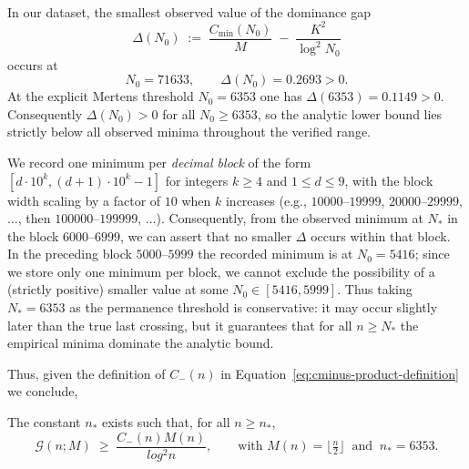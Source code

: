 \documentclass[11pt]{article}
\makeatletter
\theoremstyle{inline}
\theoremstyle{break}
\renewenvironment{proof}[1][\proofname]{%
  \par\pushQED{\qed}%
  \normalfont \topsep6\p@\@plus6\p@\relax
  \trivlist
  \item[\hskip\labelsep
        \itshape
    #1\@addpunct{.}]\mbox{}\\  %
}{%
  \popQED\endtrivlist\@endpefalse
}
\theoremstyle{break}
\theoremstyle{break}
\theoremstyle{break}
\theoremstyle{break}
\theoremstyle{inline}
\newcommand{\xPreMertens}{5416} %
\newcommand{\xMertens}{6353} %
\newcommand{\xNzeroStat}{71633} %
\newcommand{\xEtaStat}{0.2693} %
\newcommand{\xDeltaMertens}{0.1149}  %
\newcommand{\Cmeas}{C}              %
\newcommand{\CminusProduct}{C_{-}}
\makeatother
\begin{document}
\begin{proof}
In our dataset, the smallest observed value of the dominance gap
\begin{equation}
\Delta(N_0)\;:=\;\frac{\Cmeas_{\min}(N_0)}{M}\;-\;\frac{K^2}{\log^2 N_0}
\end{equation}
occurs at
\begin{equation}
N_0=\xNzeroStat,\qquad \Delta(N_0)=\xEtaStat>0.
\end{equation}
At the explicit Mertens threshold \(N_0=\xMertens\) one has
\(\Delta(\xMertens)=\xDeltaMertens>0\).
Consequently \(\Delta(N_0)>0\) for all \(N_0\ge \xMertens\), so the analytic
lower bound lies strictly below all observed minima throughout the verified range.

We record one minimum per \emph{decimal block} of the form
\([d\cdot 10^{k},(d+1)\cdot 10^{k}-1]\) for integers \(k\ge 4\) and \(1\le d\le 9\),
with the block width scaling by a factor of \(10\) when \(k\) increases (e.g.,
\(10000\text{–}19999\), \(20000\text{–}29999\), \(\dots\), then \(100000\text{–}199999\), \(\dots\)).
Consequently, from the observed minimum at \(N_\ast\) in the block
\(6000\text{–}6999\), we can assert that no smaller \( \Delta \) occurs within that block.
In the preceding block \(5000\text{–}5999\) the recorded minimum is at \(N_0=\xPreMertens\);
since we store only one minimum per block, we cannot exclude the possibility of a
(strictly positive) smaller value at some \(N_0\in[\xPreMertens,5999]\). Thus taking
\(N_\ast=\xMertens\) as the permanence threshold is conservative: it may occur
slightly later than the true last crossing, but it guarantees that for all
\(n\ge N_\ast\) the empirical minima dominate the analytic bound.

\bigskip
\noindent
Thus, given the definition of \( \CminusProduct(n) \) in Equation~\ref{eq:cminus-product-definition} we conclude,

The constant \( n_\ast \) exists such that, for all \(n \ge n_\ast\),
  \begin{equation}
    \mathcal{G}(n;M)\;\ge\;\frac{\CminusProduct(n)M(n)}{log^2 n},
    \qquad
    \text{with } M(n)=\bigl\lfloor \tfrac{n}{2} \bigr\rfloor
    \ \text{ and }\
    n_\ast=\xMertens .
    \label{eq:analytic-lower-bound-global}
  \end{equation}
\end{proof}
\end{document}
